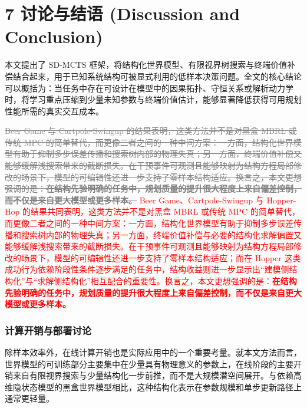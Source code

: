 \documentclass[UTF8]{ctexart}
\newcommand{\revadd}[1]{\textcolor{red}{#1}}
\newcommand{\revdel}[1]{\textcolor{gray}{\sout{#1}}}
\begin{document}
\hypertarget{ux8ba8ux8bbaux4e0eux7ed3ux8bed-discussion-and-conclusion}{%
\section{7 讨论与结语 (Discussion and
Conclusion)}\label{ux8ba8ux8bbaux4e0eux7ed3ux8bed-discussion-and-conclusion}}

本文提出了 SD-MCTS 框架，将结构化世界模型、有限视界树搜索与终端价值补偿结合起来，用于已知系统结构可被显式利用的低样本决策问题。全文的核心结论可以概括为：当任务中存在可设计在模型中的因果拓扑、守恒关系或解析动力学时，将学习重点压缩到少量未知参数与终端价值估计，能够显著降低获得可用规划性能所需的真实交互成本。

\revdel{Beer Game 与 Cartpole-Swingup 的结果表明，这类方法并不是对黑盒 MBRL 或传统 MPC 的简单替代，而更像二者之间的一种中间方案：一方面，结构化世界模型有助于抑制多步误差传播和搜索树内部的物理失真；另一方面，终端价值补偿又能够缓解浅搜索带来的截断损失。在干预事件可观测且能够映射为结构方程局部修改的场景下，模型的可编辑性还进一步支持了零样本结构适应。换言之，本文更想强调的是：\textbf{在结构先验明确的任务中，规划质量的提升很大程度上来自偏差控制，而不仅是来自更大模型或更多样本。}}
\revadd{Beer Game、Cartpole-Swingup 与 Hopper-Hop 的结果共同表明，这类方法并不是对黑盒 MBRL 或传统 MPC 的简单替代，而更像二者之间的一种中间方案：一方面，结构化世界模型有助于抑制多步误差传播和搜索树内部的物理失真；另一方面，终端价值补偿与必要的结构化求解偏置又能够缓解浅搜索带来的截断损失。在干预事件可观测且能够映射为结构方程局部修改的场景下，模型的可编辑性还进一步支持了零样本结构适应；而在 Hopper 这类成功行为依赖阶段性条件逐步满足的任务中，结构收益则进一步显示出“建模侧结构化”与“求解侧结构化”相互配合的重要性。换言之，本文更想强调的是：\textbf{在结构先验明确的任务中，规划质量的提升很大程度上来自偏差控制，而不仅是来自更大模型或更多样本。}}

\hypertarget{ux73b0ux5b9eux90e8ux7f72ux542bux4e49-online-overhead}{%
\subsubsection{计算开销与部署讨论}\label{ux73b0ux5b9eux90e8ux7f72ux542bux4e49-online-overhead}}

除样本效率外，在线计算开销也是实际应用中的一个重要考量。就本文方法而言，世界模型的可训练部分主要集中在少量具有物理意义的参数上，在线阶段的主要开销来自有限视界搜索与少量结构化一步前推，而不是大规模潜空间展开。与依赖高维隐状态模型的黑盒世界模型相比，这种结构化表示在参数规模和单步更新路径上通常更轻量。
\end{document}
